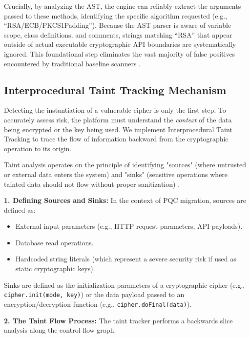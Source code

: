 \documentclass[conference]{IEEEtran}
\begin{document}
Crucially, by analyzing the AST, the engine can reliably extract the arguments passed to these methods, identifying the specific algorithm requested (e.g., ``RSA/ECB/PKCS1Padding''). Because the AST parser is aware of variable scope, class definitions, and comments, strings matching ``RSA'' that appear outside of actual executable cryptographic API boundaries are systematically ignored. This foundational step eliminates the vast majority of false positives encountered by traditional baseline scanners \cite{hazim2015}.

\subsection{Interprocedural Taint Tracking Mechanism}
Detecting the instantiation of a vulnerable cipher is only the first step. To accurately assess risk, the platform must understand the \textit{context} of the data being encrypted or the key being used. We implement Interprocedural Taint Tracking to trace the flow of information backward from the cryptographic operation to its origin.

Taint analysis operates on the principle of identifying "sources" (where untrusted or external data enters the system) and "sinks" (sensitive operations where tainted data should not flow without proper sanitization) \cite{lam2011}.

\textbf{1. Defining Sources and Sinks:} In the context of PQC migration, sources are defined as:
\begin{itemize}
    \item External input parameters (e.g., HTTP request parameters, API payloads).
    \item Database read operations.
    \item Hardcoded string literals (which represent a severe security risk if used as static cryptographic keys).
\end{itemize}
Sinks are defined as the initialization parameters of a cryptographic cipher (e.g., \texttt{cipher.init(mode, key)}) or the data payload passed to an encryption/decryption function (e.g., \texttt{cipher.doFinal(data)}).

\textbf{2. The Taint Flow Process:} 
The taint tracker performs a backwards slice analysis along the control flow graph. 
\end{document}

